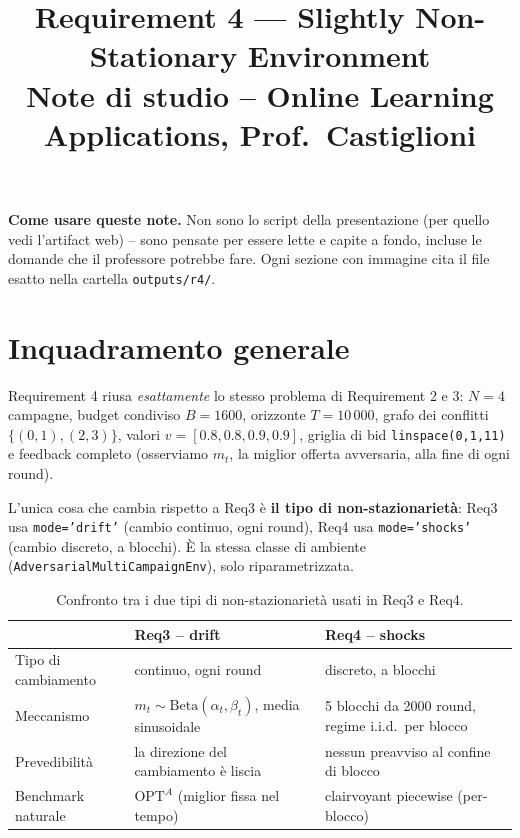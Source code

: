 \documentclass[11pt]{article}
\title{\color{inkblue}\bfseries Requirement 4 --- Slightly Non-Stationary Environment\\[4pt]
\large\normalfont\color{softgrey} Note di studio -- Online Learning Applications, Prof.\ Castiglioni}
\author{}
\date{}
\begin{document}
\maketitle
\thispagestyle{fancy}
\vspace{-1.2cm}

\begin{keybox}
\textbf{Come usare queste note.} Non sono lo script della presentazione (per quello vedi l'artifact web) -- sono pensate per essere lette e capite a fondo, incluse le domande che il professore potrebbe fare. Ogni sezione con immagine cita il file esatto nella cartella \texttt{outputs/r4/}.
\end{keybox}

\tableofcontents

\section{Inquadramento generale}

Requirement 4 riusa \emph{esattamente} lo stesso problema di Requirement 2 e 3: $N=4$ campagne, budget condiviso $B=1600$, orizzonte $T=10\,000$, grafo dei conflitti $\{(0,1),(2,3)\}$, valori $v = [0.8, 0.8, 0.9, 0.9]$, griglia di bid \texttt{linspace(0,1,11)} e feedback completo (osserviamo $m_t$, la miglior offerta avversaria, alla fine di ogni round).

L'unica cosa che cambia rispetto a Req3 è \textbf{il tipo di non-stazionarietà}: Req3 usa \texttt{mode='drift'} (cambio continuo, ogni round), Req4 usa \texttt{mode='shocks'} (cambio discreto, a blocchi). È la stessa classe di ambiente (\texttt{AdversarialMultiCampaignEnv}), solo riparametrizzata.

\begin{table}[h]
\centering
\small
\begin{tabularx}{\textwidth}{@{}l X X@{}}
\toprule
& \textbf{Req3 -- drift} & \textbf{Req4 -- shocks} \\
\midrule
Tipo di cambiamento & continuo, ogni round & discreto, a blocchi \\
Meccanismo & $m_t \sim \text{Beta}(\alpha_t,\beta_t)$, media sinusoidale & 5 blocchi da 2000 round, regime i.i.d.\ per blocco \\
Prevedibilità & la direzione del cambiamento è liscia & nessun preavviso al confine di blocco \\
Benchmark naturale & $\text{OPT}^A$ (miglior fissa nel tempo) & clairvoyant piecewise (per-blocco) \\
\bottomrule
\end{tabularx}
\caption{Confronto tra i due tipi di non-stazionarietà usati in Req3 e Req4.}
\end{table}
\end{document}
